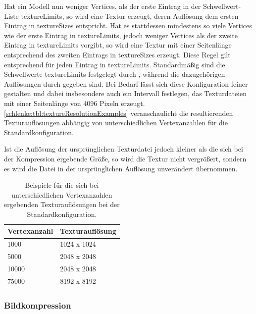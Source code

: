Hat ein Modell nun weniger Vertices, als der erste Eintrag in der Schwellwert-Liste {\ttfamily texture\-Limits}, so wird eine Textur erzeugt, deren Auflösung dem ersten Eintrag in {\ttfamily texture\-Sizes} entspricht. Hat es stattdessen mindestens so viele Vertices wie der erste Eintrag in {\ttfamily texture\-Limits}, jedoch weniger Vertices als der zweite Eintrag in {\ttfamily texture\-Limits} vorgibt, so wird eine Textur mit einer Seitenlänge entsprechend des zweiten Eintrags in {\ttfamily texture\-Sizes} erzeugt. Diese Regel gilt entsprechend für jeden Eintrag in {\ttfamily texture\-Limits}. Standardmäßig sind die Schwellwerte {\ttfamily texture\-Limits} festgelegt durch {\ttfamily [5000, 50000]}, während die dazugehörigen Auflösungen durch {\ttfamily [1024, 2048, 8192]} gegeben sind. Bei Bedarf lässt sich diese Konfiguration feiner gestalten und dabei insbesondere auch ein Intervall festlegen, das Texturdateien mit einer Seitenlänge von 4096 Pixeln erzeugt. \autoref{schlenke:tbl:textureResolutionExamples} veranschaulicht die resultierenden Texturauflösungen abhängig von unterschiedlichen Vertexanzahlen für die Standardkonfiguration. 

Ist die Auflösung der ursprünglichen Texturdatei jedoch kleiner als die sich bei der Kompression ergebende Größe, so wird die Textur nicht vergrößert, sondern es wird die Datei in der ursprünglichen Auflösung unverändert übernommen.

\begin{table}
\begin{center}
\begin{tabular}{ll}
Vertexanzahl & Texturauflösung \\
\hline
1000 & 1024 x 1024 \\
5000 & 2048 x 2048 \\
10000 & 2048 x 2048 \\
75000 & 8192 x 8192 \\
\end{tabular}
\caption{Beispiele für die sich bei unterschiedlichen Vertexanzahlen ergebenden Texturauflösungen bei der Standardkonfiguration.}
\label{schlenke:tbl:textureResolutionExamples}
\end{center}
\end{table}

\subsubsection{Bildkompression}

